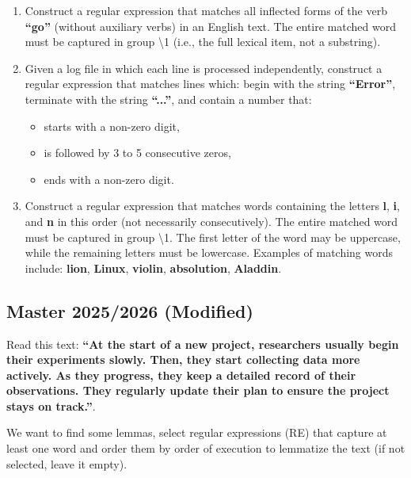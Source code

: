 \documentclass{../extra/aakpract/aakpract}
\begin{document}
	\begin{enumerate}
		
		\item Construct a regular expression that matches all inflected forms of the verb \textbf{``go''} (without auxiliary verbs) in an English text. 
		The entire matched word must be captured in group \textbackslash 1 (i.e., the full lexical item, not a substring).
		
		\item Given a log file in which each line is processed independently, construct a regular expression that matches lines which:
		begin with the string \textbf{``Error''}, terminate with the string \textbf{``...''}, and contain a number that:
		\begin{itemize}
			\item starts with a non-zero digit,
			\item is followed by 3 to 5 consecutive zeros,
			\item ends with a non-zero digit.
		\end{itemize}
		
		\item Construct a regular expression that matches words containing the letters \textbf{l}, \textbf{i}, and \textbf{n} in this order (not necessarily consecutively). 
		The entire matched word must be captured in group \textbackslash 1. 
		The first letter of the word may be uppercase, while the remaining letters must be lowercase.  
		Examples of matching words include: \textbf{lion}, \textbf{Linux}, \textbf{violin}, \textbf{absolution}, \textbf{Aladdin}.
		
	\end{enumerate}
	
	\subsection{Master 2025/2026 (Modified)}
	
	Read this text: \textbf{``At the start of a new project, researchers usually begin their experiments slowly. Then, they start collecting data more actively. As they progress, they keep a detailed record of their observations. They regularly update their plan to ensure the project stays on track.''}.
	
	We want to find some lemmas, select regular expressions (RE) that capture at least one word and order them by order of execution to lemmatize the text (if not selected, leave it empty).
	
\end{document}
